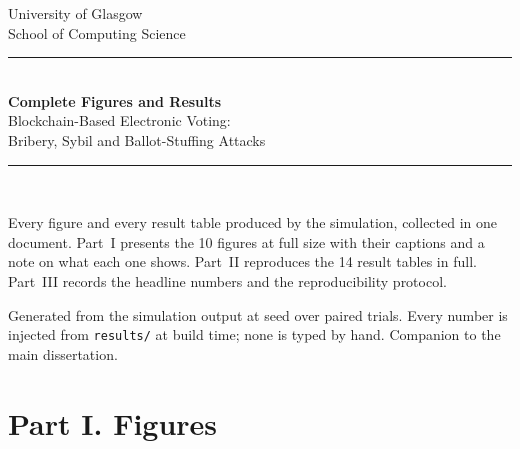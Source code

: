 \documentclass[11pt,a4paper]{article}
\newcommand{\code}[1]{\texttt{\small #1}}
\begin{document}
\begin{titlepage}
\thispagestyle{empty}
\centering
\vspace*{1.6cm}
{\sffamily\Large University of Glasgow}\\[2pt]
{\sffamily\normalsize School of Computing Science}\\[2.6cm]
{\color{rule}\rule{\textwidth}{0.9pt}}\\[0.6cm]
{\sffamily\LARGE\bfseries Complete Figures and Results}\\[0.4cm]
{\sffamily\Large Blockchain-Based Electronic Voting:}\\[0.16cm]
{\sffamily\Large Bribery, Sybil and Ballot-Stuffing Attacks}\\[0.6cm]
{\color{rule}\rule{\textwidth}{0.9pt}}\\[1.4cm]

\begin{minipage}{0.86\textwidth}
\centering\normalsize
Every figure and every result table produced by the simulation, collected in
one document. Part~I presents the 10 figures at full size with
their captions and a note on what each one shows. Part~II reproduces the
14 result tables in full. Part~III records the headline numbers and
the reproducibility protocol.
\end{minipage}

\vfill
{\footnotesize\color{inkmuted}
Generated from the simulation output at seed \Seed{} over \TotalTrials{} paired trials.
Every number is injected from \code{results/} at build time; none is typed by hand.
Companion to the main dissertation.}
\end{titlepage}

\tableofcontents
\clearpage

\section*{Part I. Figures}
\end{document}
